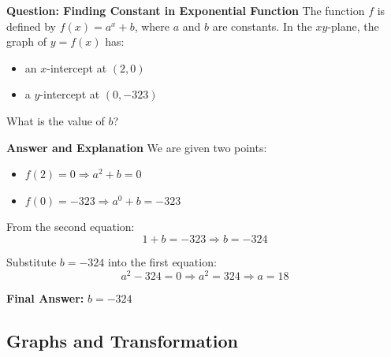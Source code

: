 \documentclass{beamer}
\begin{document}
\begin{frame}{\textbf{Question: Finding Constant in Exponential Function}}
The function $f$ is defined by $f(x) = a^x + b$, where $a$ and $b$ are constants. In the $xy$-plane, the graph of $y = f(x)$ has:
\begin{itemize}
    \item an $x$-intercept at $(2, 0)$
    \item a $y$-intercept at $(0, -323)$
\end{itemize}
What is the value of $b$?
\end{frame}


\begin{frame}{\textbf{Answer and Explanation}}
We are given two points:
\begin{itemize}
    \item $f(2) = 0 \Rightarrow a^2 + b = 0$
    \item $f(0) = -323 \Rightarrow a^0 + b = -323$
\end{itemize}

From the second equation:
\[
1 + b = -323 \Rightarrow b = -324
\]

Substitute $b = -324$ into the first equation:
\[
a^2 - 324 = 0 \Rightarrow a^2 = 324 \Rightarrow a = 18
\]

\textbf{Final Answer:} $b = \boxed{-324}$
\end{frame}
\begin{frame}
\section{Graphs and Transformation}
\end{frame}
\end{document}
